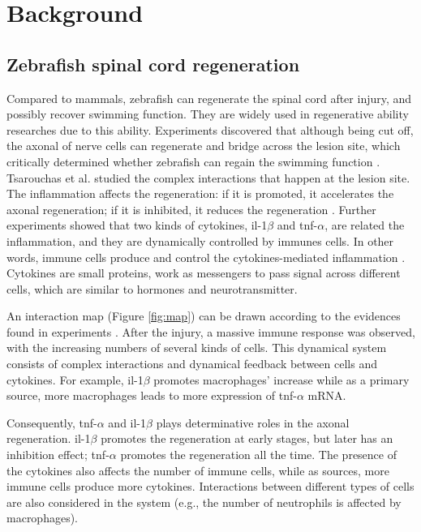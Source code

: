 \chapter{Background}

\section{Zebrafish spinal cord regeneration}


Compared to mammals, zebrafish can regenerate the spinal cord after injury, and possibly recover swimming function. They are widely used in regenerative ability researches due to this ability. Experiments discovered that although being cut off, the axonal of nerve cells can regenerate and bridge across the lesion site, which critically determined whether zebrafish can regain the swimming function \cite{axonal}. Tsarouchas et al. \cite{ref:Tsarouchas} studied the complex interactions that happen at the lesion site. The inflammation affects the regeneration: if it is promoted, it accelerates the axonal regeneration; if it is inhibited, it reduces the regeneration \cite{ref:Tsarouchas}. Further experiments showed that two kinds of cytokines, il-1$\beta$ and tnf-$\alpha$, are related the inflammation, and they are dynamically controlled by immunes cells. In other words, immune cells produce and control the cytokines-mediated inflammation \cite{ref:Tsarouchas}. Cytokines are small proteins, work as messengers to pass signal across different cells, which are similar to hormones and neurotransmitter.

An interaction map (Figure \ref{fig:map}) can be drawn according to the evidences found in experiments \cite{ref:Tsarouchas}. After the injury, a massive immune response was observed, with the increasing numbers of several kinds of cells. This dynamical system consists of complex interactions and dynamical feedback between cells and cytokines. For example, il-1$\beta$ promotes macrophages' increase while as a primary source, more macrophages leads to more expression of tnf-$\alpha$ mRNA. 

Consequently, tnf-$\alpha$ and il-1$\beta$ plays determinative roles in the axonal regeneration. il-1$\beta$ promotes the regeneration at early stages, but later has an inhibition effect; tnf-$\alpha$ promotes the regeneration all the time. The presence of the cytokines also affects the number of immune cells, while as sources, more immune cells produce more cytokines. Interactions between different types of cells are also considered in the system (e.g., the number of neutrophils is affected by macrophages).

